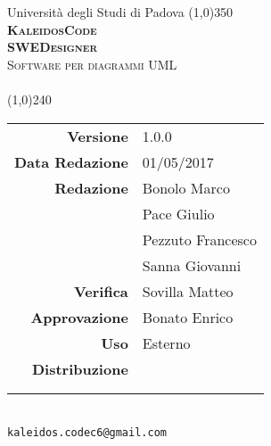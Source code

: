 \documentclass[a4paper,12pt]{article}
\author{KaleidosCode}
\date{09/03/2017}	%
\begin{document}
	\begin{titlepage}
		\centering Università degli Studi di Padova
		\line(1,0){350}\\
		\vspace{0.4cm}
		{\bfseries\scshape\LARGE KaleidosCode\\}
		\vspace{0.4cm}
		{\bfseries\scshape\LARGE SWEDesigner\\}
		{\scshape\Large Software per diagrammi UML\\}
		\vspace{1cm}
		{\scshape\Large \specificatecnicai\ \\}		%
		\vspace{1.4cm}
		\logo
		\vspace{1.2cm}
		\line(1,0){240}\\
		\begin{tabular}{r|l}
			{\hfill \textbf{Versione}} 			& 1.0.0\\
			{\hfill \textbf{Data Redazione}} 	& 01/05/2017\\	%
			{\hfill \textbf{Redazione}} 		& Bonolo Marco\\ & Pace Giulio\\ & Pezzuto Francesco\\ & Sanna Giovanni\\
			{\hfill \textbf{Verifica}} 			& Sovilla Matteo\\
			{\hfill \textbf{Approvazione}} 		& Bonato Enrico\\
			{\hfill \textbf{Uso}} 				& Esterno\\
			{\hfill \textbf{Distribuzione}} 	& \vardanega \\ & \cardin \\ & \proponente\\
		\end{tabular}\\
		\vspace{2cm}
		\texttt{kaleidos.codec6@gmail.com}
	\end{titlepage}

	\pagestyle{myfront}
	\newpage
		
	\newpage
		\tableofcontents
	\newpage
		\listoftables
	\newpage
		\listoffigures
	\newpage
	\pagestyle{mymain}
		
	\newpage
		
	\newpage
		
	\newpage
		
	\newpage
		
	\appendix
	\newpage
		
	\label{LastPage}
\end{document}
